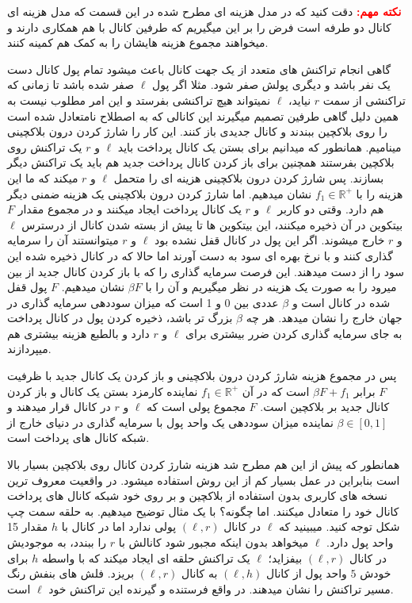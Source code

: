 \textcolor{red}{\textbf{نکته مهم:}}
دقت کنید که در مدل هزینه ای مطرح شده در این قسمت که مدل هزینه ای کانال دو طرفه است فرض را بر این میگیریم که طرفین کانال با هم همکاری دارند و میخواهند مجموع هزینه هایشان را به کمک هم کمینه کنند.


گاهی انجام تراکنش های متعدد از یک جهت کانال باعث میشود تمام پول کانال دست یک نفر باشد و دیگری پولش صفر شود. مثلا اگر پول $\ell$ صفر شده باشد تا زمانی که تراکنشی از سمت $r$ نیاید، $\ell$ نمیتواند هیچ تراکنشی بفرستد و این امر مطلوب نیست به همین دلیل گاهی طرفین تصمیم میگیرند این کانالی که به اصطلاح نامتعادل  شده است را روی بلاکچین ببندند و کانال جدیدی باز کنند. این کار را شارژ کردن درون بلاکچینی مینامیم.
همانطور که میدانیم برای بستن یک کانال پرداخت باید $\ell$ و $r$ یک تراکنش روی بلاکچین بفرستند همچنین برای باز کردن کانال پرداخت جدید هم باید یک تراکنش دیگر بسازند. پس شارژ کردن درون بلاکچینی هزینه ای را متحمل $\ell$ و $r$  میکند که ما این هزینه را با 
$f_1 \in \mathbb{R}^+$
نشان میدهیم. اما شارژ کردن درون بلاکچینی یک هزینه ضمنی دیگر هم دارد. وقتی دو کاربر $\ell$ و $r$ یک کانال پرداخت ایجاد میکنند و در مجموع مقدار $F$ بیتکوین در آن ذخیره میکنند، این بیتکوین ها تا پیش از بسته شدن کانال از درسترس $\ell$ و $r$ خارج میشوند. اگر این پول در کانال قفل نشده بود $\ell$ و $r$ میتوانستند آن را سرمایه گذاری کنند و با نرخ بهره ای سود به دست آورند اما حالا که در کانال ذخیره شده این سود را از دست میدهند. این فرصت سرمایه گذاری را که با باز کردن کانال جدید از بین میرود را به صورت یک هزینه در نظر میگیریم و آن را با 
$\beta F$
نشان میدهیم. $F$ پول قفل شده در کانال است و $\beta$ عددی بین 0 و 1 است که میزان سوددهی سرمایه گذاری در جهان خارج را نشان میدهد. هر چه $\beta$ بزرگ تر باشد، ذخیره کردن پول در کانال پرداخت به جای سرمایه گذاری کردن ضرر بیشتری برای  $\ell$ و $r$  دارد و بالطبع هزینه بیشتری هم میپردازند. 

پس در مجموع هزینه شارژ کردن درون بلاکچینی و باز کردن یک کانال جدید با ظرفیت $F$ برابر 
$\beta F + f_1$
است که در آن
$f_1 \in \mathbb{R}^+$
نماینده کارمزد بستن یک کانال و باز کردن کانال جدید بر بلاکچین است. 
$F$
مجموع پولی است که $\ell$ و $r$ در کانال قرار میدهند و
$\beta \in [0,1]$
نماینده میزان سوددهی یک واحد پول با سرمایه گذاری در دنیای خارج از شبکه کانال های پرداخت است.

  همانطور که پیش از این هم مطرح شد هزینه شارژ کردن کانال روی بلاکچین بسیار بالا است بنابراین در عمل بسیار کم از این روش استفاده میشود. در واقعیت معروف ترین نسخه های کاربری  بدون استفاده از بلاکچین و بر روی خود شبکه کانال های پرداخت کانال خود را متعادل میکنند. اما چگونه؟ با یک مثال توضیح میدهیم. به حلقه سمت چپ شکل  توجه کنید. میبینید که $\ell$ در کانال
$(\ell , r)$
پولی ندارد اما در کانال با $h$ مقدار 15 واحد پول دارد. $\ell$ میخواهد بدون اینکه مجبور شود کانالش با $r$ را ببندد، به موجودیش در کانال 
$(\ell , r)$
بیفزاید؛ $\ell$ یک تراکنش حلقه ای ایجاد میکند که با واسطه $h$ برای خودش $5$ واحد پول از کانال 
$(\ell , h)$
به کانال
$(\ell , r)$
بریزد. فلش های بنفش رنگ مسیر تراکنش را نشان میدهند. در واقع فرستنده و گیرنده این تراکنش خود $\ell$ است. 

